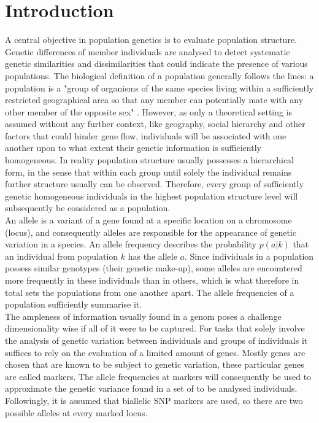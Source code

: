 \documentclass[a4paper, 11pt]{article}
\begin{document}
\section{Introduction}
A central objective in population genetics is to evaluate population structure. Genetic differences of member individuals are analysed  to detect systematic genetic similarities and dissimilarities that could indicate the presence of various populations. The biological definition of a population generally follows the lines: a population is a "group of organisms of the same species living within a sufficiently restricted geographical area so that any member can potentially mate with any other member of the opposite sex" \parencite{hartl1997principles}. However, as only a theoretical setting is assumed without any further context, like geography, social hierarchy and other factors that could hinder gene flow, individuals will be associated with one another upon to what extent their genetic information is sufficiently homogeneous. In reality population structure usually possesses a hierarchical form, in the sense that within each group until solely the individual remains further structure usually can be observed. Therefore, every group of sufficiently genetic homogeneous individuals in the highest population structure level will subsequently be considered as a population.\\
An allele is a variant of a gene found at a specific location on a chromosome (locus), and consequently alleles are responsible for the appearance of genetic variation in a species. An allele frequency describes the probability $p(a | k)$ that an individual from population $k$ has the allele $a$. Since individuals in a population possess similar genotypes (their genetic make-up), some alleles are encountered more frequently in these individuals than in others, which is what therefore in total sets the populations from one another apart. The allele frequencies of a population sufficiently summarise it.\\
The ampleness of information usually found in a genom poses a challenge dimensionality wise if all of it were to be captured. For tasks that solely involve the analysis of genetic variation between individuals and groups of individuals it suffices to rely on the evaluation of a limited amount of genes. Mostly genes are chosen that are known to be subject to genetic variation, these particular genes are called markers. The allele frequencies at markers will consequently be used to approximate the genetic variance found in a set of to be analysed individuals. Followingly, it is assumed that biallelic SNP markers are used, so there are two possible alleles at every marked locus.\\
\end{document}
